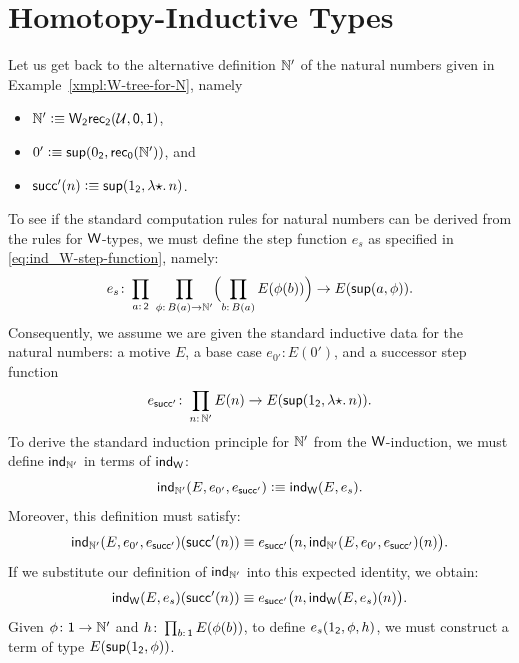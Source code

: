 \section{Homotopy-Inductive Types}\label{homotopy-inductive-types}

Let us get back to the alternative definition $\mathbb{N}'$ of the natural numbers given in Example~\ref{xmpl:W-tree-for-N}, namely
\begin{itemize}
    \item $\mathbb{N}'\mathrel{\vcentcolon}\equiv\mathsf{W}_{\mathsf{2}}\mathsf{rec}_{\mathsf{2}}(\mathcal U,\mathsf{0},\mathsf{1})$,
    \item $0'\mathrel{\vcentcolon}\equiv\mathsf{sup}(0_{\mathsf{2}},\mathsf{rec}_{\mathsf{0}}(\mathbb{N}'))$, and
    \item $\mathsf{succ}'(n)\mathrel{\vcentcolon}\equiv\mathsf{sup}(1_{\mathsf{2}},\lambda{{\mathsf{\star}}}.\,n)$.
\end{itemize}
To see if the standard computation rules for natural numbers can be derived from the rules for $\mathsf{W}$-types, we must define the step function $e_s$ as specified in \eqref{eq:ind_W-step-function}, namely:
\[
    e_s\colon
    \prod_{a\colon\fun2}\;
    \prod_{\phi\colon B(a)\to\N'}
    \Bigl(\prod_{b\colon B(a)}E(\phi(b))\Bigr)
    \to E(\fun{sup}(a,\phi)).
\]
Consequently, we assume we are given the standard inductive data for the natural numbers: a motive $E$, a base case $e_{0'}\colon E(0')$, and a successor step function
\[
    e_{\fun{succ}'}\colon\prod_{n\colon\N'}E(n)
    \to E(\fun{sup}(1_{\fun2},\lambda{\fstar}.\,n)).
\]
To derive the standard induction principle for $\mathbb{N}'$ from the $\mathsf{W}$-induction, we must define $\mathsf{ind}_{\mathbb{N}'}$ in terms of $\mathsf{ind}_{\mathsf{W}}$:
\[
    \mathsf{ind}_{\mathbb{N}'}(E,e_{0'},e_{\mathsf{succ}'})
        \mathrel{\vcentcolon}\equiv\mathsf{ind}_{\mathsf{W}}(E,e_s).
\]
Moreover, this definition must satisfy:
\[
    \mathsf{ind}_{\mathbb{N}'}(E,e_{0'},e_{\mathsf{succ}'})(\mathsf{succ}'(n))
    \equiv
        e_{\mathsf{succ}'}\bigl(
                n,
                \mathsf{ind}_{\mathbb{N}'}(
                    E,e_{0'},
                    e_{\mathsf{succ}'}
                    )(n)
            \bigr).
\]
If we substitute our definition of $\mathsf{ind}_{\mathbb{N}'}$ into this expected identity, we obtain:
\begin{equation}\label{eq:ind_W-requirement}
    \mathsf{ind}_{\mathsf{W}}(E,e_s)(\mathsf{succ}'(n))
    \equiv
        e_{\mathsf{succ}'}\bigl(
                n,
                \mathsf{ind}_{\mathsf{W}}(E,e_s)(n)
            \bigr).
\end{equation}
Given $\phi\colon\fun1\to\N'$ and $h\colon\prod_{b\colon\fun1}E(\phi(b))$, to define $e_s(1_{\mathsf{2}},\phi,h)$, we must construct a term of type $E(\mathsf{sup}(1_{\mathsf{2}},\phi))$.

